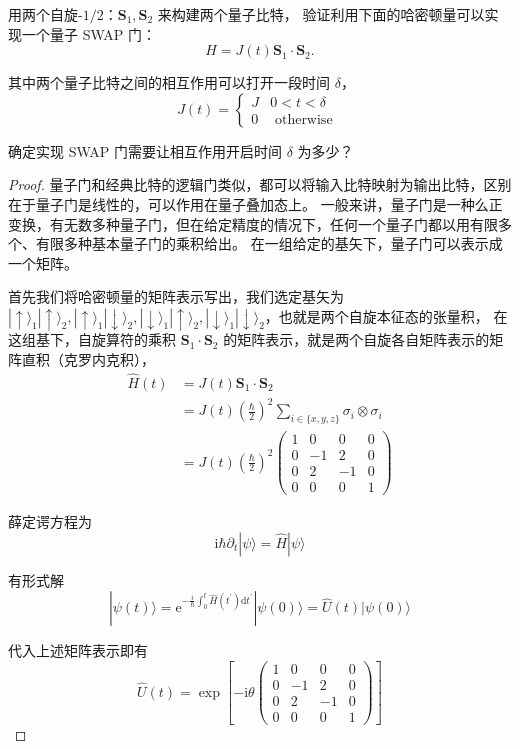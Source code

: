 \begin{3}
    用两个自旋-$1/2$：$\mathbf{S}_{1}, \mathbf{S}_{2}$ 来构建两个量子比特，
    验证利用下面的哈密顿量可以实现一个量子 SWAP 门：
$$H=J(t) \mathbf{S}_{1} \cdot \mathbf{S}_{2}.$$

其中两个量子比特之间的相互作用可以打开一段时间 $\delta$，
$$J(t)= \begin{cases}J & 0<t<\delta \\ 0 & \text { otherwise }\end{cases}$$

确定实现 SWAP 门需要让相互作用开启时间 $\delta$ 为多少？
\end{3}

\begin{proof}
    量子门和经典比特的逻辑门类似，都可以将输入比特映射为输出比特，区别在于量子门是线性的，可以作用在量子叠加态上。
    一般来讲，量子门是一种么正变换，有无数多种量子门，但在给定精度的情况下，任何一个量子门都以用有限多个、有限多种基本量子门的乘积给出。
    在一组给定的基矢下，量子门可以表示成一个矩阵。

首先我们将哈密顿量的矩阵表示写出，我们选定基矢为 $|\uparrow\rangle_{1}|\uparrow\rangle_{2},|\uparrow\rangle_{1}|\downarrow\rangle_{2},|\downarrow\rangle_{1}|\uparrow\rangle_{2},|\downarrow\rangle_{1}|\downarrow\rangle_{2}$，也就是两个自旋本征态的张量积，
在这组基下，自旋算符的乘积 $\mathbf{S}_{1} \cdot \mathbf{S}_{2}$ 的矩阵表示，就是两个自旋各自矩阵表示的矩阵直积（克罗内克积），
$$\begin{aligned}
\hat{H}(t) & =J(t) \mathbf{S}_{1} \cdot \mathbf{S}_{2} \\
& =J(t)\left(\frac{\hbar}{2}\right)^{2} \sum_{i \in \{x, y, z\}} \sigma_{i} \otimes \sigma_{i} \\
& =J(t)\left(\frac{\hbar}{2}\right)^{2}\begin{pmatrix}
1 & 0 & 0 & 0 \\
0 & -1 & 2 & 0 \\
0 & 2 & -1 & 0 \\
0 & 0 & 0 & 1
\end{pmatrix}
\end{aligned}$$

薛定谔方程为
$$\mathrm{i} \hbar \partial_{t}|\psi\rangle=\hat{H}|\psi\rangle$$

有形式解
$$|\psi(t)\rangle=\mathrm{e}^{-\frac{i}{\hbar} \int_{0}^{t} \hat{H}\left(t^{\prime}\right) \mathrm{d} t^{\prime}}|\psi(0)\rangle
=\hat{U}(t)|\psi(0)\rangle$$

代入上述矩阵表示即有
$$\hat{U}(t)=\exp \left[-\mathrm{i} \theta\begin{pmatrix}
1 & 0 & 0 & 0 \\
0 & -1 & 2 & 0 \\
0 & 2 & -1 & 0 \\
0 & 0 & 0 & 1
\end{pmatrix}\right]$$


\end{proof}
